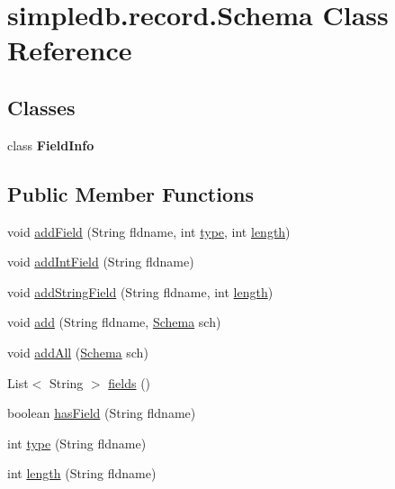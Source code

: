 \hypertarget{classsimpledb_1_1record_1_1Schema}{}\section{simpledb.\+record.\+Schema Class Reference}
\label{classsimpledb_1_1record_1_1Schema}
\subsection*{Classes}
\begin{DoxyCompactItemize}
\item 
class {\bfseries Field\+Info}
\end{DoxyCompactItemize}
\subsection*{Public Member Functions}
\begin{DoxyCompactItemize}
\item 
void \hyperlink{classsimpledb_1_1record_1_1Schema_a1361880d713ad0c059395869bf59c5e2}{add\+Field} (String fldname, int \hyperlink{classsimpledb_1_1record_1_1Schema_a2fe42c01b7fc3c09b25ef1d1d87a48a8}{type}, int \hyperlink{classsimpledb_1_1record_1_1Schema_a69e2645054df731e09efd43feee7345c}{length})
\item 
void \hyperlink{classsimpledb_1_1record_1_1Schema_a1954fe8a259b3dc5dffe6587ca977b8c}{add\+Int\+Field} (String fldname)
\item 
void \hyperlink{classsimpledb_1_1record_1_1Schema_a8b13da3f48da0a6b3d48300d34a4db3c}{add\+String\+Field} (String fldname, int \hyperlink{classsimpledb_1_1record_1_1Schema_a69e2645054df731e09efd43feee7345c}{length})
\item 
void \hyperlink{classsimpledb_1_1record_1_1Schema_a9848518dc6b8857524ef48ed058491c5}{add} (String fldname, \hyperlink{classsimpledb_1_1record_1_1Schema}{Schema} sch)
\item 
void \hyperlink{classsimpledb_1_1record_1_1Schema_a34e19c8e5025c96c2a6b552123139be8}{add\+All} (\hyperlink{classsimpledb_1_1record_1_1Schema}{Schema} sch)
\item 
List$<$ String $>$ \hyperlink{classsimpledb_1_1record_1_1Schema_a0ce7f930b6af17b11ac6fe9082be7f45}{fields} ()
\item 
boolean \hyperlink{classsimpledb_1_1record_1_1Schema_a8f7aba3f1db8af14135c81802fe7a5e0}{has\+Field} (String fldname)
\item 
int \hyperlink{classsimpledb_1_1record_1_1Schema_a2fe42c01b7fc3c09b25ef1d1d87a48a8}{type} (String fldname)
\item 
int \hyperlink{classsimpledb_1_1record_1_1Schema_a69e2645054df731e09efd43feee7345c}{length} (String fldname)
\end{DoxyCompactItemize}



